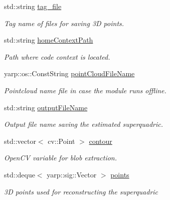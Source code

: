 \begin{DoxyCompactItemize}
\mbox{\label{classSuperqModule_a06b5f43aeaa26b5ca5961670f8883ab4}} 
std\+::string \mbox{\hyperlink{classSuperqModule_a06b5f43aeaa26b5ca5961670f8883ab4}{tag\+\_\+file}}
\begin{DoxyCompactList}\small\item\em Tag name of files for saving 3D points. \end{DoxyCompactList}\item 
\mbox{\label{classSuperqModule_aa767064e88d01bc7cd8fb2038c63e150}} 
std\+::string \mbox{\hyperlink{classSuperqModule_aa767064e88d01bc7cd8fb2038c63e150}{home\+Context\+Path}}
\begin{DoxyCompactList}\small\item\em Path where code context is located. \end{DoxyCompactList}\item 
\mbox{\label{classSuperqModule_aa719adf35eb593b75e0f0930aa18a4f7}} 
yarp\+::os\+::\+Const\+String \mbox{\hyperlink{classSuperqModule_aa719adf35eb593b75e0f0930aa18a4f7}{point\+Cloud\+File\+Name}}
\begin{DoxyCompactList}\small\item\em Pointcloud name file in case the module runs offline. \end{DoxyCompactList}\item 
\mbox{\label{classSuperqModule_aac8cd7786df2bc4aeb0f7290807c4c49}} 
std\+::string \mbox{\hyperlink{classSuperqModule_aac8cd7786df2bc4aeb0f7290807c4c49}{output\+File\+Name}}
\begin{DoxyCompactList}\small\item\em Output file name saving the estimated superquadric. \end{DoxyCompactList}\item 
\mbox{\label{classSuperqModule_a2a3cbd0eb9042671dbbc457f5cb25c29}} 
std\+::vector$<$ cv\+::\+Point $>$ \mbox{\hyperlink{classSuperqModule_a2a3cbd0eb9042671dbbc457f5cb25c29}{contour}}
\begin{DoxyCompactList}\small\item\em Open\+CV variable for blob extraction. \end{DoxyCompactList}\item 
\mbox{\label{classSuperqModule_a9d894dfd7e6564ee41a98619c8178584}} 
std\+::deque$<$ yarp\+::sig\+::\+Vector $>$ \mbox{\hyperlink{classSuperqModule_a9d894dfd7e6564ee41a98619c8178584}{points}}
\begin{DoxyCompactList}\small\item\em 3D points used for reconstructing the superquadric \end{DoxyCompactList}\item 

\end{DoxyCompactItemize}
